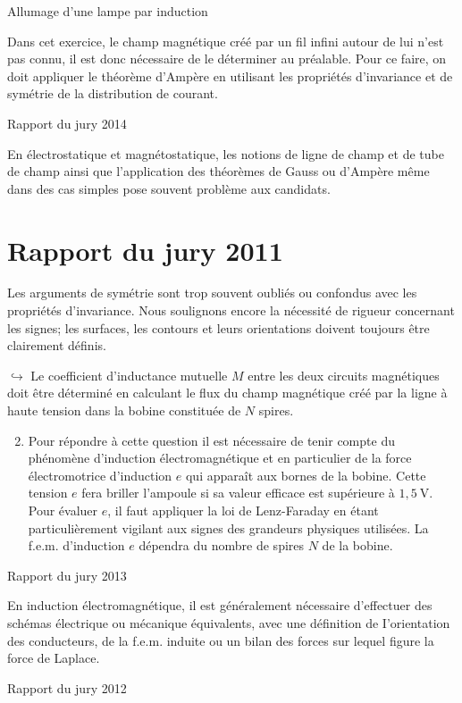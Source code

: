\begin{exo}[PC][1][oral]{Allumage d'une lampe par induction}
{Dans cet exercice, le champ magnétique créé par un fil infini autour de lui n'est pas connu, il est donc nécessaire de le déterminer au préalable. Pour ce faire, on\\
doit appliquer le théorème d'Ampère en utilisant les propriétés d'invariance et de symétrie de la distribution de courant.

Rapport du jury 2014

En électrostatique et magnétostatique, les notions de ligne de champ et de tube de champ ainsi que l'application des théorèmes de Gauss ou d'Ampère même dans des cas simples pose souvent problème aux candidats.

\section*{Rapport du jury 2011}
Les arguments de symétrie sont trop souvent oubliés ou confondus avec les propriétés d'invariance. Nous soulignons encore la nécessité de rigueur concernant les signes; les surfaces, les contours et leurs orientations doivent toujours être clairement définis.

$\hookrightarrow$ Le coefficient d'inductance mutuelle $M$ entre les deux circuits magnétiques doit être déterminé en calculant le flux du champ magnétique créé par la ligne à haute tension dans la bobine constituée de $N$ spires.

\begin{enumerate}
  \setcounter{enumi}{1}
  \item Pour répondre à cette question il est nécessaire de tenir compte du phénomène d'induction électromagnétique et en particulier de la force électromotrice d'induction $e$ qui apparaît aux bornes de la bobine. Cette tension $e$ fera briller l'ampoule si sa valeur efficace est supérieure à $1,5 \mathrm{~V}$. Pour évaluer $e$, il faut appliquer la loi de Lenz-Faraday en étant particulièrement vigilant aux signes des grandeurs physiques utilisées. La f.e.m. d'induction $e$ dépendra du nombre de spires $N$ de la bobine.
\end{enumerate}

Rapport du jury 2013

En induction électromagnétique, il est généralement nécessaire d'effectuer des schémas électrique ou mécanique équivalents, avec une définition de I'orientation des conducteurs, de la f.e.m. induite ou un bilan des forces sur lequel figure la force de Laplace.

Rapport du jury 2012

}
\end{exo}
